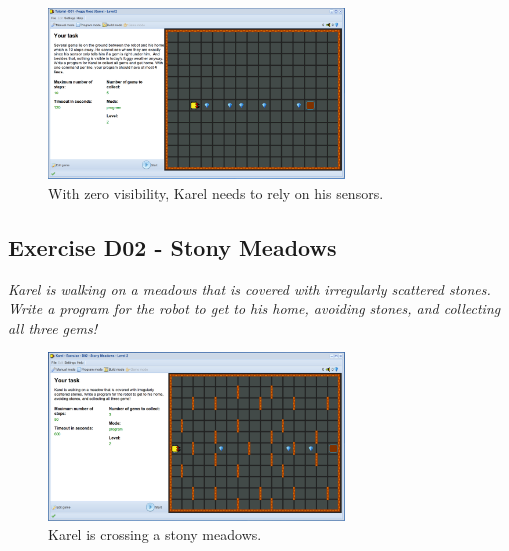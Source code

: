 \documentclass[article,A4,12pt]{llncs}
\begin{document}
\begin{figure}[!ht]
\begin{center}
\includegraphics[width=0.7\textwidth]{img/d01.png}
\end{center}
\vspace{-4mm}
\caption{With zero visibility, Karel needs to rely on his sensors.}
\label{fig:d01}
\vspace{-4mm}
\end{figure}
\noindent

\newpage

\subsection{Exercise D02 - Stony Meadows}

{\em Karel is walking on a meadows that is covered with irregularly 
scattered stones. Write a program for the robot to get to his home, 
avoiding stones, and collecting all three gems!  }


\begin{figure}[!ht]
\begin{center}
\includegraphics[width=0.7\textwidth]{img/d02.png}
\end{center}
\vspace{-4mm}
\caption{Karel is crossing a stony meadows.}
\label{fig:d02}
\vspace{-4mm}
\end{figure}
\noindent
\end{document}
